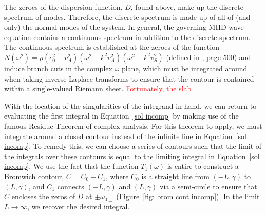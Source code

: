 \documentclass{aastex61}
\begin{document}
The zeroes of the dispersion function, $D$, found above, make up the discrete spectrum of modes. Therefore, the discrete spectrum is made up of all of (and only) the normal modes of the system. In general, the governing MHD wave equation contains a continuous spectrum in addition to the discrete spectrum. The continuous spectrum is established at the zeroes of the function $N(\omega^2) = \rho (c_0^2 + v_A^2)(\omega^2 - k^2v_A^2)(\omega^2 - k^2v_S^2)$ (defined in \cite{goe_etal04}, page 500) and induce branch cuts in the complex $\omega$ plane, which must be integrated around when taking inverse Laplace transforms to ensure that the contour is contained within a single-valued Riemann sheet. \textcolor{red}{Fortunately, the slab }

With the location of the singularities of the integrand in hand, we can return to evaluating the first integral in Equation~\eqref{sol incomp} by making use of the famous Residue Theorem of complex analysis. For this theorem to apply, we must integrate around a closed contour instead of the infinite line in Equation~\eqref{sol incomp}. To remedy this, we can choose a series of contours such that the limit of the integrals over these contours is equal to the limiting integral in Equation~\eqref{sol incomp}. We use the fact that the function $T_1(\omega)$ is entire to construct a Bromwich contour, $C = C_0 + C_1$, where $C_0$ is a straight line from $(-L, \gamma)$ to $(L, \gamma)$, and $C_1$ connects $(-L, \gamma)$ and $(L, \gamma)$ via a semi-circle to ensure that $C$ encloses the zeros of $D$ at $\pm\omega_{0\pm}$ (Figure~\ref{fig: brom cont incomp}). In the limit $L \to \infty$, we recover the desired integral.
\end{document}
